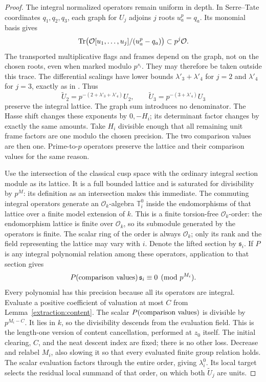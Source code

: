 \begin{proof}
The integral normalized operators remain uniform in depth.
In Serre--Tate coordinates $q_1,q_2,q_3$, each graph for $U_j$
adjoins $j$ roots $u_a^p=q_a$.  Its monomial basis gives
\[
 \operatorname{Tr}\bigl(\mathcal O[u_1,\ldots,u_j]/(u_a^p-q_a)\bigr)
                         \subset p^j\mathcal O.
\]
The transported multiplicative flags and frames depend on the
graph, not on the chosen roots, even when marked modulo
$p^{s_i}$.  They may therefore be taken outside this trace.
The differential scalings have lower bounds
$\lambda'_3+\lambda'_4$ for $j=2$ and $\lambda'_4$ for $j=3$,
exactly as in \cite[Lemma~7.3]{C}.  Thus
\[
 \widetilde U_2=p^{-(2+\lambda'_3+\lambda'_4)}U_2,
 \qquad
 \widetilde U_3=p^{-(3+\lambda'_4)}U_3
\]
preserve the integral lattice.  The graph sum introduces no
denominator.  The Hasse shift changes these exponents by $0,-H_i$;
its determinant factor changes by exactly the same amounts.
Take $H_i$ divisible enough that all remaining unit frame factors
are one modulo the chosen precision.  The two comparison values
are then one.  Prime-to-$p$ operators preserve the lattice and
their comparison values for the same reason.

Use the intersection of the classical cusp space with the
ordinary integral section module as its lattice.  It is a full
bounded lattice and is saturated for divisibility by $p^M$:
its definition as an intersection makes this immediate.  The
commuting integral operators generate an $\mathcal O_k$-algebra
$\mathbb T_i^0$ inside the endomorphisms of that lattice over
a finite model extension of $k$.  This is a finite torsion-free
$\mathcal O_k$-order: the endomorphism lattice is finite over
$\mathcal O_k$, so its submodule generated by the operators is
finite.  The scalar ring of the order is always $\mathcal O_k$;
only its rank and the field representing the lattice may vary
with $i$.  Denote the lifted section by $\mathfrak s_i$.
If $P$ is any integral polynomial relation among these operators,
application to that section gives
\[
               P(\hbox{comparison values})\,\mathfrak s_i
                                      \equiv0\pmod {p^{M_i}}.
\]
Every polynomial has this precision because all its operators
are integral.  Evaluate a positive coefficient of valuation at
most $C$ from Lemma~\ref{extraction:content}.  The scalar
$P(\hbox{comparison values})$ is divisible by $p^{M_i-C}$.
It lies in $k$, so the divisibility descends from the evaluation
field.  This is the length-one version of content cancellation,
performed at $z_0$ itself.  The initial clearing, $C$, and the
neat descent index are fixed; there is no other loss.  Decrease
and relabel $M_i$, also slowing it so that every evaluated finite
group relation holds.  The scalar evaluation factors through
the entire order, giving $\lambda_i^0$.  Its local target selects
the residual local summand of that order, on which both
$\widetilde U_j$ are units.
\end{proof}

